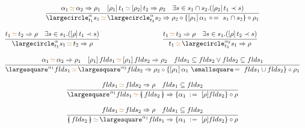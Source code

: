 \documentclass[11pt,a4paper]{article}
\newcommand{\record}[1]{\{\!\!\shortmid #1 \shortmid\!\!\}}
\newcommand{\overld}[3]{\largecircle^{#1}_{#2}{#3}}
\newcommand{\irecrd}[2]{\largesquare^{#1}{#2}}
\newcommand{\tyvarsubst}[2]{#1\ \hspace{-0.2ex}:\hspace{1pt}=\ #2}
\newcommand{\ovldrefine}[2]{#1\ \circ\hspace{-0.3ex}=\ #2}
\newcommand{\irecextend}[2]{#1\ \smallsquare\hspace{-0.3ex}=\ #2}
\newcommand{\unify}[3]{#1\,{\color{brown}{\simeq}}\,#2 \Rightarrow #3}
\newcommand{\subst}[2]{[#1]\,#2}
\newcommand{\braced}[1]{\{#1\}}
\newcommand{\compose}[2]{#1 \circ #2}
\begin{document}
\[
\begin{array}{ccc}
 \multicolumn{3}{c}{\cfrac
  {\unify{\alpha_1}{\alpha_2}{\rho_1} \quad \unify{\subst{\rho_1}{t_1}}{\subst{\rho_2}{t_2}}{\rho_2} \quad
   \exists s \in s_1 \cap s_2. (\subst{\rho_2}{t_1} \prec s)}
  {\unify{\overld{\alpha}{t_1}{s_1}}{\overld{\alpha}{t_2}{s_2}}
         {\rho_2 \circ \{\ovldrefine{\subst{\rho_1}{\alpha_1}}{s_1 \cap s_2}\} \circ \rho_1}}}              \\
 & &                                                                                                        \\
 \cfrac
  {\unify{t_1}{t_2}{\rho} \quad \exists s \in s_1. (\subst{\rho}{t_1} \prec s)}
  {\unify{\overld{\alpha}{t_1}{s_1}}{t_2}{\rho}} & \quad &
 \cfrac
  {\unify{t_1}{t_2}{\rho} \quad \exists s \in s_1. (\subst{\rho}{t_2} \prec s)}
  {\unify{t_1}{\overld{\alpha_2}{t_2}{s_1}}{\rho}}                                                          \\
 & &                                                                                                        \\
 \multicolumn{3}{c}{\cfrac
  {\unify{\alpha_1}{\alpha_2}{\rho_1} \quad
   \unify{\subst{\rho_1}{flds_1}}{\subst{\rho_1}{flds_2}}{\rho_2} \quad
   flds_1 \subseteq flds_2 \vee flds_2 \subseteq flds_1 }
  {\unify{\irecrd{\alpha_1}{flds_1}}{\irecrd{\alpha_2}{flds_2}}
         {\rho_2 \circ \{\irecextend{\subst{\rho_1}{\alpha_1}}{flds_1 \cup flds_2}\} \circ \rho_1}}}        \\
 & &                                                                                                        \\
 \multicolumn{3}{c}{\cfrac
  {\unify{flds_1}{flds_2}{\rho} \quad flds_1 \subseteq flds_2}
  {\unify{\irecrd{\alpha_1}{flds_1}}{\record{flds_2}}
         {\compose{\braced{\tyvarsubst{\alpha_1}{[\rho]flds_2}}}{\rho}}}}                                   \\
 & &                                \\
 \multicolumn{3}{c}{\cfrac
  {\unify{flds_1}{flds_2}{\rho} \quad flds_1 \subseteq flds_2}
  {\unify{\record{flds_2}}{\irecrd{\alpha_1}{flds_1}}
         {\compose{\braced{\tyvarsubst{\alpha_1}{[\rho]flds_2}}}{\rho}}}}                                   \\
\end{array}
\]
\end{document}
